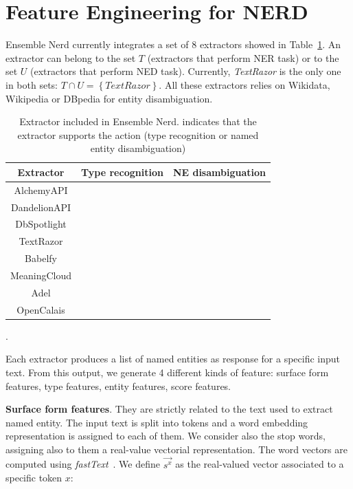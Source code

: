 \documentclass{llncs}
\newcommand{\cmark}{\ding{51}}
\newcommand{\xmark}{\ding{55}}
\newcommand{\tabref}[1]{\mbox{Table~\ref{#1}}}
\begin{document}

\section{Feature Engineering for NERD}
\label{sec:study}
Ensemble Nerd currently integrates a set of 8 extractors showed in \tabref{tab:exout}. An extractor can belong to the set $T$ (extractors that perform NER task) or to the set $U$ (extractors that perform NED task). Currently, \textit{TextRazor} is the only one in both sets: $T \cap U = \left \{  TextRazor \right \}$. All these extractors relies on Wikidata, Wikipedia or DBpedia for entity disambiguation.
 
\begin{table}
\centering
\label{tab:exout}
\begin{tabular}{|c|c|c|}
\hline
\textbf{Extractor} & \textbf{Type recognition} & \textbf{NE disambiguation} \\ \hline
AlchemyAPI    & \cmark  & \xmark \\ \hline
DandelionAPI  & \xmark  & \cmark \\ \hline
DbSpotlight   & \xmark  & \cmark \\ \hline
TextRazor     & \cmark  & \cmark \\ \hline
Babelfy       & \xmark  & \cmark \\ \hline
MeaningCloud  & \cmark  & \xmark \\ \hline
Adel          & \cmark  & \xmark \\ \hline
OpenCalais    & \cmark  & \xmark \\ \hline
\end{tabular}
\bigskip
\caption{Extractor included in Ensemble Nerd. \cmark{ }indicates that the extractor supports the action (type recognition or named entity disambiguation)}.
\end{table}

Each extractor produces a list of named entities as response for a specific input text. From this output, we generate 4 different kinds of feature: surface form features, type features, entity features, score features.

\textbf{Surface form features}. They are strictly related to the text used to extract named entity. The input text is split into tokens and a word embedding representation is assigned to each of them. We consider also the stop words, assigning also to them a real-value vectorial representation.
The word vectors are computed using \textit{fastText}~\cite{fasttext}. We define $\vec{s^{x}}$ as the real-valued vector associated to a specific token $x$:
\end{document}

